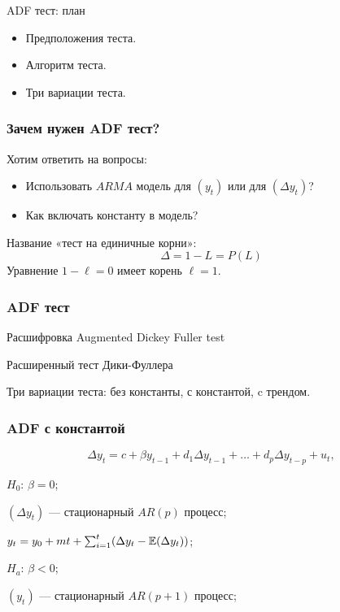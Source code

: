 
\begin{frame} %


\end{frame}



\begin{frame}{ADF тест: план}
  \begin{itemize}[<+->]
    \item Предположения теста.
    \item Алгоритм теста.
    \item Три вариации теста.
  \end{itemize}

\end{frame}


\begin{frame}
  \frametitle{Зачем нужен ADF тест?}

  Хотим ответить на вопросы:
  \pause
  \begin{itemize}[<+->]
    \item Использовать $ARMA$ модель для $(y_t)$ или для $(\Delta y_t)$?
    \item Как включать константу в модель?
  \end{itemize}

  \pause
  Название «тест на единичные корни»:
  \pause
  \[
  \Delta = 1 - L = P(L) 
  \]
  Уравнение $1 - \ell = 0$ имеет корень $\ell =1$.

\end{frame}

\begin{frame}
  \frametitle{ADF тест}
  
  \begin{block}{Расшифровка}
    Augmented Dickey Fuller test
    
    Расширенный тест Дики-Фуллера  
  \end{block}

  \pause 
  Три вариации теста: без константы, с константой, c трендом.
  
\end{frame}


\begin{frame}
  \frametitle{ADF с константой}
  \[
  \Delta y_t = c + \beta y_{t-1} + d_1 \Delta y_{t-1} + \ldots + d_p \Delta y_{t-p} + u_t,  
  \]

  \pause

  \alert{$H_0$: $\beta = 0$};
  
  $(\Delta y_t)$ — стационарный $AR(p)$ процесс;

  $y_t = y_0 + mt + \sum_{i=1}^t (\Delta y_t - \mathbb{E}(\Delta y_t))$;

  \pause

  \alert{$H_a$: $\beta < 0$};

  $(y_t)$ — стационарный $AR(p + 1)$ процесс;

\end{frame}

